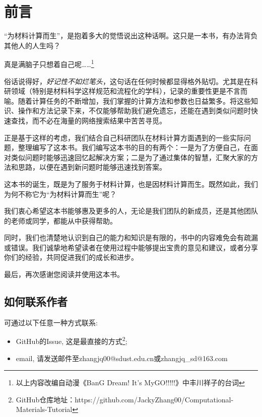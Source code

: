\chapter*{前言}

“为材料计算而生”，是抱着多大的觉悟说出这种话啊。这只是一本书，有办法背负其他人的人生吗？

\begin{center}
真是满脑子只想着自己呢……\footnote{以上内容改编自动漫《BanG Dream! It's MyGO!!!!!》中丰川祥子的台词}
\end{center}

俗话说得好，\textit{好记性不如烂笔头}，这句话在任何时候都显得格外贴切。尤其是在科研领域（特别是材料科学这样规范和流程化的学科），记录的重要性更是不言而喻。随着计算任务的不断增加，我们掌握的计算方法和参数也日益繁多。将这些知识、操作和方法记录下来，不仅能够帮助我们避免遗忘，还能在遇到类似问题时快速查找，而不必在海量的网络搜索结果中苦苦寻觅。

正是基于这样的考虑，我们结合自己科研团队在材料计算方面遇到的一些实际问题，整理编写了这本书。我们编写这本书的目的有两个：一是为了方便自己，在面对类似问题时能够迅速回忆起解决方案；二是为了通过集体的智慧，汇聚大家的方法和思路，以便在遇到新问题时能够迅速找到答案。

这本书的诞生，既是为了服务于材料计算，也是因材料计算而生。既然如此，我们为何不称它为“为材料计算而生”呢？

我们衷心希望这本书能够惠及更多的人，无论是我们团队的新成员，还是其他团队的老师或同学，都能从中获得帮助。

同时，我们也清楚地认识到自己的能力和知识是有限的，书中的内容难免会有疏漏或错误。我们诚挚地希望读者在使用过程中能够提出宝贵的意见和建议，或者分享你们的经验，共同促进我们的成长和进步。

最后，再次感谢您阅读并使用这本书。

\newpage

\section*{如何联系作者}
可通过以下任意一种方式联系:
\begin{itemize}
    \item GitHub的Issue, 这是最直接的方式\footnote{GitHub仓库地址：https://github.com/JackyZhang00/Computational-Materials-Tutorial};
    \item email, 请发送邮件至zhangjq00@sdust.edu.cn或zhangjq\_sd@163.com
\end{itemize}

